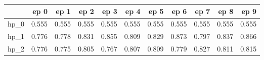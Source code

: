 \begin{tabular}{lrrrrrrrrrr}
\toprule
{} &   ep 0 &   ep 1 &   ep 2 &   ep 3 &   ep 4 &   ep 5 &   ep 6 &   ep 7 &   ep 8 &   ep 9 \\
\midrule
hp\_0 &  0.555 &  0.555 &  0.555 &  0.555 &  0.555 &  0.555 &  0.555 &  0.555 &  0.555 &  0.555 \\
hp\_1 &  0.776 &  0.778 &  0.831 &  0.855 &  0.809 &  0.829 &  0.873 &  0.797 &  0.837 &  0.866 \\
hp\_2 &  0.776 &  0.775 &  0.805 &  0.767 &  0.807 &  0.809 &  0.779 &  0.827 &  0.811 &  0.815 \\
\bottomrule
\end{tabular}
